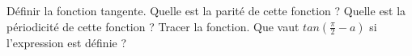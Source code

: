 %
%
	\begin{tasks}
		\task Définir la fonction tangente.
		\task Quelle est la parité de cette fonction ?
		\task Quelle est la périodicité de cette fonction ?
		\task Tracer la fonction.
		\task Que vaut $tan(\frac{\pi}{2}-a)$ si l'expression est définie ?
	\end{tasks}
